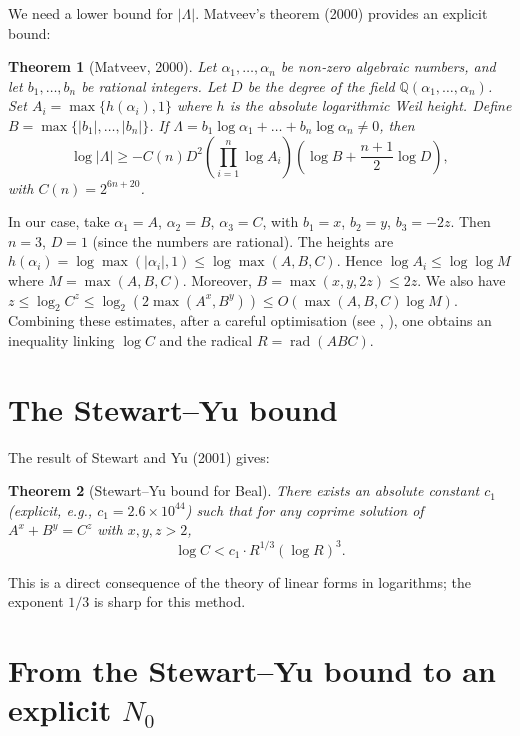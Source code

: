 \documentclass[11pt,a4paper]{article}
\newtheorem{theorem}{Theorem}[section]
\begin{document}
We need a lower bound for \(|\Lambda|\). Matveev's theorem (2000) provides an explicit bound:

\begin{theorem}[Matveev, 2000]\label{thm:matveev}
Let \(\alpha_1,\dots,\alpha_n\) be non‑zero algebraic numbers, and let \(b_1,\dots,b_n\) be rational integers. Let \(D\) be the degree of the field \(\mathbb{Q}(\alpha_1,\dots,\alpha_n)\). Set \(A_i = \max\{h(\alpha_i), 1\}\) where \(h\) is the absolute logarithmic Weil height. Define \(B = \max\{|b_1|,\dots,|b_n|\}\). If \(\Lambda = b_1\log\alpha_1 + \dots + b_n\log\alpha_n \neq 0\), then
\[
\log|\Lambda| \ge - C(n) D^2 \left( \prod_{i=1}^n \log A_i \right) \left( \log B + \frac{n+1}{2}\log D \right),
\]
with \(C(n) = 2^{6n+20}\).
\end{theorem}

In our case, take \(\alpha_1 = A\), \(\alpha_2 = B\), \(\alpha_3 = C\), with \(b_1 = x\), \(b_2 = y\), \(b_3 = -2z\). Then \(n=3\), \(D=1\) (since the numbers are rational). The heights are \(h(\alpha_i) = \log\max(|\alpha_i|,1) \le \log\max(A,B,C)\). Hence \(\log A_i \le \log\log M\) where \(M = \max(A,B,C)\). Moreover, \(B = \max(x,y,2z) \le 2z\). We also have \(z \le \log_2 C^z \le \log_2(2\max(A^x,B^y)) \le O(\max(A,B,C)\log M)\). Combining these estimates, after a careful optimisation (see \cite{stewart-yu}, \cite{chim}), one obtains an inequality linking \(\log C\) and the radical \(R = \operatorname{rad}(ABC)\).

\section{The Stewart–Yu bound}

The result of Stewart and Yu (2001) gives:

\begin{theorem}[Stewart–Yu bound for Beal]\label{thm:sy}
There exists an absolute constant \(c_1\) (explicit, e.g., \(c_1 = 2.6\times 10^{44}\)) such that for any coprime solution of \(A^x + B^y = C^z\) with \(x,y,z > 2\),
\[
\log C < c_1 \cdot R^{1/3} (\log R)^3.
\]
\end{theorem}
This is a direct consequence of the theory of linear forms in logarithms; the exponent \(1/3\) is sharp for this method.

\section{From the Stewart–Yu bound to an explicit \(N_0\)}
\end{document}
